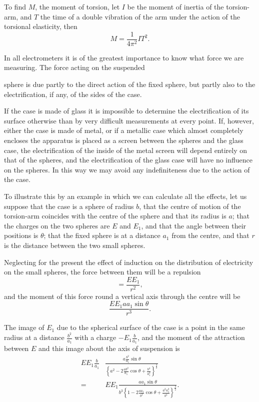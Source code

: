 \documentclass[11pt,a4paper]{article}
\begin{document}
To find $M$, the moment of torsion, let $I$ be the moment of inertia
of the torsion-arm, and $T$ the time of a double vibration of the arm
under the action of the torsional elasticity, then
\[
M=\frac{1}{4\pi^2}IT^2.
\]

In all electrometers it is of the greatest importance to know
what force we are measuring. The force acting on the suspended

\clearpage

sphere is due partly to the direct action of the fixed sphere, but
partly also to the electrification, if any, of the sides of the case.

If the case is made of glass it is impossible to determine the
electrification of its surface otherwise than by very difficult
measurements at every point. If, however, either the case is made
of metal, or if a metallic case which almost completely encloses the
apparatus is placed as a screen between the spheres and the glass
case, the electrification of the inside of the metal screen will depend
entirely on that of the spheres, and the electrification of the glass
case will have no influence on the spheres. In this way we may
avoid any indefiniteness due to the action of the case.

To illustrate this by an example in which we can calculate all
the effects, let us suppose that the case is a sphere of radius $b$,
that the centre of motion of the torsion-arm coincides with the
centre of the sphere and that its radius is $a$; that the charges on
the two spheres are $E$ and $E_1$, and that the angle between their
positions is $\theta$; that the fixed sphere is at a distance $a_1$ from
the centre, and that $r$ is the distance between the two small spheres.

Neglecting for the present the effect of induction on the distribution
of electricity on the small spheres, the force between them will be
a repulsion
\[
=\frac{EE_1}{r^2},
\]
and the moment of this force round a vertical axis through the
centre will be
\[
\frac{EE_1aa_1\sin\theta}{r^3}.
\]

The image of $E_1$ due to the spherical surface of the case is a point
in the same radius at a distance $\frac{b^2}{a_1}$ with a charge
$-E_1\frac{b}{a_1}$, and the moment of the attraction between $E$
and this image about the axis of suspension is
\[
\begin{split}
EE_1\frac{b}{a_1}
&\frac{a\frac{b^2}{a_1}\sin\theta}
{\left\{a^2-2\frac{ab^2}{a_1}\cos\theta+\frac{b^4}{a_1^2}\right\}^{\frac{3}{2}}}
\\
={}&EE_1
\frac{aa_1\sin\theta}
{b^3\left\{1-2\frac{aa_1}{b^2}\cos\theta+\frac{a^2a_1^2}{b^4}\right\}^{\frac{3}{2}}}.
\end{split}
\]
\end{document}
